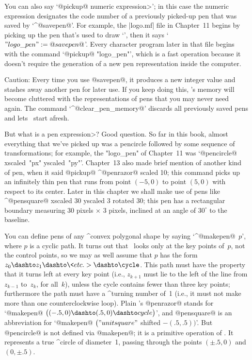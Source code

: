 {{{{You can also say `@pickup@ \<numeric expression>'; in this case the numeric
expression designates the code number of a previously picked-up pen
that was saved by `^@savepen@'. For example, the |logo.mf| file in Chapter~11
begins by picking up the pen that's used to draw `\MF\kern1pt', then
it says `$"logo\_pen":=@savepen@$'. Every character program later in that
file begins with the command `@pickup@ "logo\_pen"', which is a fast
operation because it doesn't require the generation of a new
pen representation inside the computer.

\danger Caution: Every time you use @savepen@, it produces a new integer
value and stashes away another pen for later use. If you keep doing this,
\MF's memory will become cluttered with the representations of pens
that you may never need again. The command `^@clear\_pen\_memory@'
discards all previously saved pens and lets \MF\ start afresh.

\danger But what is a \<pen expression>? Good question. So far in this book,
almost everything that we've picked up was a pencircle followed by
some sequence of transformations; for example, the "logo\_pen" of
Chapter~11 was `@pencircle@ xscaled~"px" yscaled~"py"'. Chapter~13
also made brief mention of another kind of pen, when it said
\begindisplay
@pickup@ ^@penrazor@ scaled 10;
\enddisplay
this command picks up an infinitely thin pen that runs from point
$(-5,0)$ to point $(5,0)$ with respect to its center. Later in this
chapter we shall make use of pens like
\begindisplay
^@pensquare@ xscaled 30 yscaled 3 rotated 30;
\enddisplay
this pen has a rectangular boundary measuring 30 pixels $\times$ 3 pixels,
inclined at an angle of $30^\circ$ to the baseline.

\danger You can define pens of any ^{convex polygon}al shape by saying
`^@makepen@~$p$', where $p$ is a cyclic path. It turns out that \MF\
looks only at the key points of~$p$, not the control points, so we may
as well assume that $p$ has the form $z_0\dashto z_1\dashto\<etc.>\dashto
\cycle$. This path must have the property that it turns left at every
key point (i.e., $z_{k+1}$ must lie to the left of the line from $z_{k-1}$
to~$z_k$, for all~$k$), unless the cycle contains fewer than three key
points; furthermore the path must have a ^{turning number} of~1 (i.e.,
it must not make more than one counterclockwise loop). Plain \MF's
@penrazor@ stands for
`@makepen@ $\bigl((-.5,0)\dashto(.5,0)\dashto cycle\bigr)$',
and @pensquare@ is an abbreviation for
`@makepen@ $\bigl("unitsquare"$ shifted $-(.5,.5)\bigr)$'.
But @pencircle@ is not defined via @makepen@; it is a
primitive operation of \MF. It represents a true ^{circle} of diameter~1,
passing through the points $(\pm.5,0)$ and $(0,\pm.5)$.

}}}}

